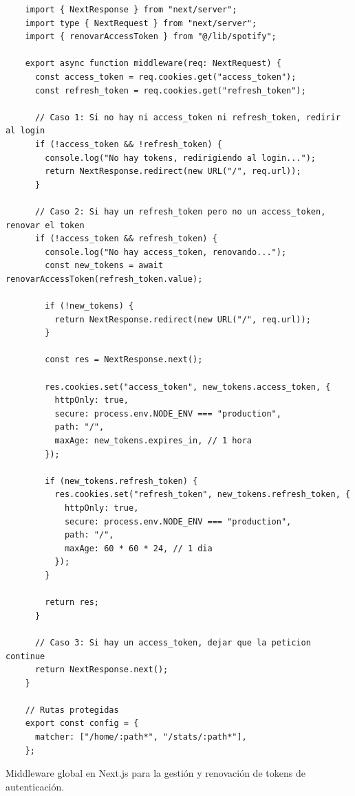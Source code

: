 \begin{ifalgorithm}[H]
    \begin{lstlisting}
    import { NextResponse } from "next/server";
    import type { NextRequest } from "next/server";
    import { renovarAccessToken } from "@/lib/spotify";

    export async function middleware(req: NextRequest) {
      const access_token = req.cookies.get("access_token");
      const refresh_token = req.cookies.get("refresh_token");

      // Caso 1: Si no hay ni access_token ni refresh_token, redirir al login
      if (!access_token && !refresh_token) {
        console.log("No hay tokens, redirigiendo al login...");
        return NextResponse.redirect(new URL("/", req.url));
      }

      // Caso 2: Si hay un refresh_token pero no un access_token, renovar el token
      if (!access_token && refresh_token) {
        console.log("No hay access_token, renovando...");
        const new_tokens = await renovarAccessToken(refresh_token.value);

        if (!new_tokens) {
          return NextResponse.redirect(new URL("/", req.url));
        }

        const res = NextResponse.next();

        res.cookies.set("access_token", new_tokens.access_token, {
          httpOnly: true,
          secure: process.env.NODE_ENV === "production",
          path: "/",
          maxAge: new_tokens.expires_in, // 1 hora
        });

        if (new_tokens.refresh_token) {
          res.cookies.set("refresh_token", new_tokens.refresh_token, {
            httpOnly: true,
            secure: process.env.NODE_ENV === "production",
            path: "/",
            maxAge: 60 * 60 * 24, // 1 dia
          });
        }

        return res;
      }

      // Caso 3: Si hay un access_token, dejar que la peticion continue
      return NextResponse.next();
    }

    // Rutas protegidas
    export const config = {
      matcher: ["/home/:path*", "/stats/:path*"],
    };
    \end{lstlisting}
    \caption{Middleware global en Next.js para la gestión y renovación de tokens de autenticación.}
    \label{alg:middleware}
\end{ifalgorithm}

